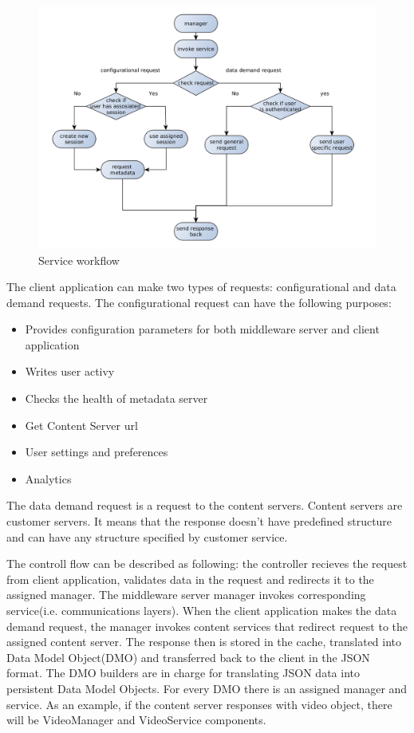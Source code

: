 \begin{figure}[h]
    \centering
	\includegraphics[width=\textwidth]{images/via_service_1.png}
    \caption{Service workflow}
    \label{fig:via_service}
\end{figure}


The client application can make two types of requests: configurational and data demand requests.
The configurational request can have the following purposes:

\begin{itemize}
	\item Provides configuration parameters for both middleware server and client application
	\item Writes user activy
	\item Checks the health of metadata server
	\item Get Content Server url
	\item User settings and preferences
	\item Analytics
\end{itemize}


The data demand request is a request to the content servers. Content servers are customer servers. It means that the response doesn't have predefined structure and can have any structure specified by customer service. 

The controll flow can be described as following: the controller recieves the request from client application, validates data in the request and redirects it to the assigned manager. The middleware server manager invokes corresponding service(i.e. communications layers). When the client application makes the data demand request, the manager invokes content services that redirect request to the assigned content server. The response then is stored in the cache, translated into Data Model Object(DMO) and transferred back to the client in the JSON format. The DMO builders are in charge for translating JSON data into persistent Data Model Objects. For every DMO there is an assigned manager and service. As an example, if the content server responses with video object, there will be VideoManager and VideoService components.   

